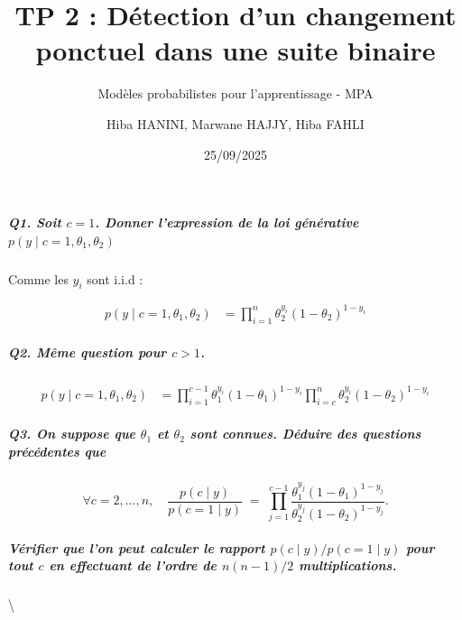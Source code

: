 \documentclass[
]{article}
\title{TP 2 : Détection d'un changement ponctuel dans une suite binaire}
\subtitle{Modèles probabilistes pour l'apprentissage - MPA}
\author{Hiba HANINI, Marwane HAJJY, Hiba FAHLI}
\date{25/09/2025}
\begin{document}
\maketitle

\subparagraph{\texorpdfstring{Q1. Soit \(c = 1\). Donner l'expression de
la loi générative
\(p(y \mid c = 1, \theta_1, \theta_2)\)}{Q1. Soit c = 1. Donner l'expression de la loi générative p(y \textbackslash mid c = 1, \textbackslash theta\_1, \textbackslash theta\_2)}}\label{q1.-soit-c-1.-donner-lexpression-de-la-loi-guxe9nuxe9rative-py-mid-c-1-theta_1-theta_2}

Comme les \(y_i\) sont i.i.d :

\[
\begin{aligned}
p(y \mid c = 1, \theta_1, \theta_2) &= \prod_{i=1}^n \theta_2^{y_i} (1 - \theta_2)^{1 - y_i}
\end{aligned}
\]

\subparagraph{\texorpdfstring{Q2. Même question pour
\(c > 1\).}{Q2. Même question pour c \textgreater{} 1.}}\label{q2.-muxeame-question-pour-c-1.}

\[
\begin{aligned}
p(y \mid c = 1, \theta_1, \theta_2) &= \prod_{i=1}^{c-1} \theta_1^{y_i} (1 - \theta_1)^{1 - y_i} \prod_{i=c}^{n} \theta_2^{y_i} (1 - \theta_2)^{1 - y_i} 
\end{aligned}
\]

\subparagraph{\texorpdfstring{Q3. On suppose que \(\theta_1\) et
\(\theta_2\) sont connues. Déduire des questions précédentes
que}{Q3. On suppose que \textbackslash theta\_1 et \textbackslash theta\_2 sont connues. Déduire des questions précédentes que}}\label{q3.-on-suppose-que-theta_1-et-theta_2-sont-connues.-duxe9duire-des-questions-pruxe9cuxe9dentes-que}

\[
\forall c = 2, \ldots, n, \quad
\frac{p(c \mid y)}{p(c = 1 \mid y)} \;=\;
\prod_{j=1}^{c-1}
\frac{\theta_1^{y_j}(1 - \theta_1)^{1-y_j}}{\theta_2^{y_j}(1 - \theta_2)^{1-y_j}}.
\]

\subparagraph{\texorpdfstring{Vérifier que l'on peut calculer le rapport
\(p(c \mid y)/p(c = 1 \mid y)\) pour tout \(c\) en effectuant de l'ordre
de \(n(n - 1)/2\)
multiplications.}{Vérifier que l'on peut calculer le rapport p(c \textbackslash mid y)/p(c = 1 \textbackslash mid y) pour tout c en effectuant de l'ordre de n(n - 1)/2 multiplications.}}\label{vuxe9rifier-que-lon-peut-calculer-le-rapport-pc-mid-ypc-1-mid-y-pour-tout-c-en-effectuant-de-lordre-de-nn---12-multiplications.}

\textbackslash{}
\end{document}

